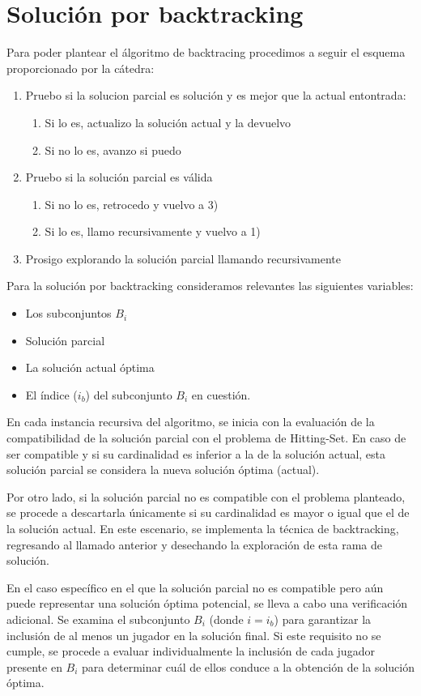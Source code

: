 \section{Solución por backtracking}

Para poder plantear el álgoritmo de backtracing procedimos a seguir el esquema proporcionado por la cátedra:
\begin{enumerate}
    \item Pruebo si la solucion parcial es solución y es mejor que la actual entontrada:
    \begin {enumerate}
        \item Si lo es, actualizo la solución actual y la devuelvo
        \item Si no lo es, avanzo si puedo
    \end{enumerate}
    \item Pruebo si la solución parcial es válida
    \begin {enumerate}
        \item Si no lo es, retrocedo y vuelvo a 3)
        \item Si lo es, llamo recursivamente y vuelvo a 1)
    \end{enumerate}
    \item Prosigo explorando la solución parcial llamando recursivamente
\end{enumerate}

Para la solución por backtracking consideramos relevantes las siguientes variables:
\begin{itemize}
    \item Los subconjuntos $B_i$
    \item Solución parcial
    \item La solución actual óptima 
    \item El índice ($i_b$) del subconjunto $B_i$ en cuestión. 
\end{itemize}

En cada instancia recursiva del algoritmo, se inicia con la evaluación de la compatibilidad de la solución parcial con el problema de Hitting-Set. En caso de ser compatible y si su cardinalidad es inferior a la de la solución actual, esta solución parcial se considera la nueva solución óptima (actual).

Por otro lado, si la solución parcial no es compatible con el problema planteado, se procede a descartarla únicamente si su cardinalidad es mayor o igual que el de la solución actual. En este escenario, se implementa la técnica de backtracking, regresando al llamado anterior y desechando la exploración de esta rama de solución.

En el caso específico en el que la solución parcial no es compatible pero aún puede representar una solución óptima potencial, se lleva a cabo una verificación adicional. Se examina el subconjunto $B_i$ (donde $i=i_b$) para garantizar la inclusión de al menos un jugador en la solución final. Si este requisito no se cumple, se procede a evaluar individualmente la inclusión de cada jugador presente en $B_i$ para determinar cuál de ellos conduce a la obtención de la solución óptima.